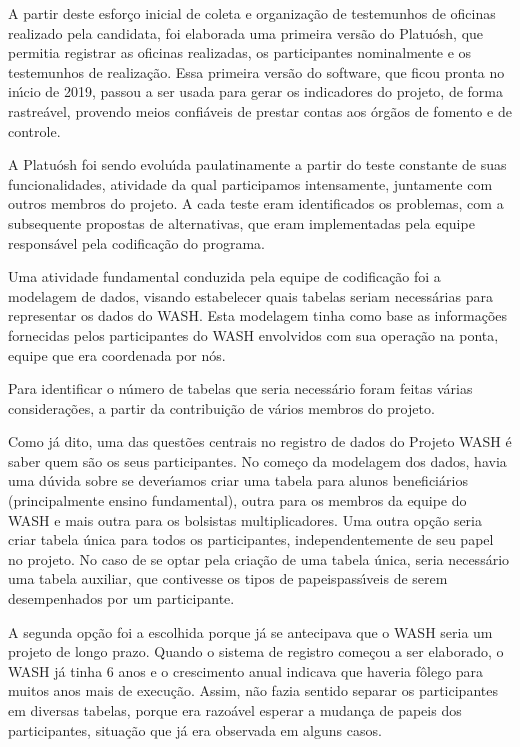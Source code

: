 \documentclass[
12pt,		%
openright,	%
twoside,  %
a4paper,			%
chapter=TITLE,		%
english,			%
french,				%
spanish,			%
brazil				%
]{USPSC-classe/USPSC}
\begin{document}
A partir deste esfor\c{c}o inicial de coleta e organiza\c{c}\~ao de testemunhos de oficinas realizado pela candidata, foi elaborada uma primeira vers\~ao do Platu\'osh, que permitia registrar as oficinas realizadas, os participantes nominalmente e os testemunhos de realiza\c{c}\~ao. Essa primeira vers\~ao do software, que ficou pronta no in\'{\i}cio de 2019, passou a ser usada para gerar os indicadores do projeto, de forma rastre\'avel, provendo meios confi\'aveis de prestar contas aos \'org\~aos de fomento e de controle.


A Platu\'osh foi sendo evolu\'{\i}da paulatinamente a partir do teste constante de suas funcionalidades, atividade da qual participamos intensamente, juntamente com outros membros do projeto. A cada teste eram identificados os problemas, com a subsequente propostas de alternativas, que eram implementadas pela equipe respons\'avel pela codifica\c{c}\~ao do programa.


Uma atividade fundamental conduzida pela equipe de codifica\c{c}\~ao foi a modelagem de dados, visando estabelecer quais tabelas seriam necess\'arias para representar os dados do WASH. Esta modelagem tinha como base as informa\c{c}\~oes fornecidas pelos participantes do WASH envolvidos com sua opera\c{c}\~ao na ponta, equipe que era coordenada por n\'os.


Para identificar o n\'umero de tabelas que seria necess\'ario foram feitas v\'arias considera\c{c}\~oes, a partir da contribui\c{c}\~ao de v\'arios membros do projeto.


Como j\'a dito, uma das quest\~oes centrais no registro de dados do Projeto WASH \'e saber quem s\~ao os seus participantes. No come\c{c}o da modelagem dos dados, havia uma d\'uvida sobre se dever\'{\i}amos criar uma tabela para alunos benefici\'arios (principalmente ensino fundamental), outra para os membros da equipe do WASH e mais outra para os bolsistas multiplicadores. Uma outra op\c{c}\~ao seria criar tabela \'unica para todos os participantes, independentemente de seu papel no projeto. No caso de se optar pela cria\c{c}\~ao de uma tabela \'unica, seria necess\'ario uma tabela auxiliar, que contivesse os \textquotedbl tipos de papeis\textquotedbl  pass\'{\i}veis de serem desempenhados por um participante.


A segunda op\c{c}\~ao foi a escolhida porque j\'a se antecipava que o WASH seria um projeto de longo prazo. Quando o sistema de registro come\c{c}ou a ser elaborado, o WASH j\'a tinha 6 anos e o crescimento anual indicava que haveria f\^olego para muitos anos mais de execu\c{c}\~ao. Assim, n\~ao fazia sentido separar os participantes em diversas tabelas, porque era razo\'avel esperar a mudan\c{c}a de papeis dos participantes, situa\c{c}\~ao que j\'a era observada em alguns casos.
\end{document}
